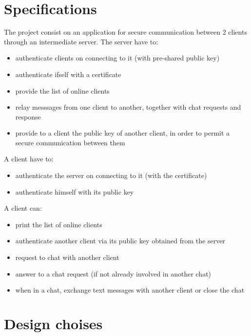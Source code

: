 \documentclass[11pt]{report}
\begin{document}
\chapter{Specifications}
	\noindent The project consist on an application for secure communication between 2 clients through an intermediate server.
	\newline
	The server have to:
	\begin{itemize}
		\item authenticate clients on connecting to it (with pre-shared public key)
		\item authenticate ifself with a certificate
		\item provide the list of online clients
		\item relay messsages from one client to another, together with chat requests and response
		\item provide to a client the public key of another client, in order to permit a secure communication between them
	\end{itemize}
	A client have to:
	\begin{itemize}
		\item authenticate the server on connecting to it (with the certificate)
		\item authenticate himself with its public key
	\end{itemize}
	A client can:
	\begin{itemize}
		\item print the list of online clients
		\item authenticate another client via its public key obtained from the server
		\item request to chat with another client
		\item answer to a chat request (if not already involved in another chat)
		\item when in a chat, exchange text messages with another client or close the chat
	\end{itemize}

\newpage
\chapter{Design choises}
\end{document}
